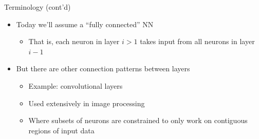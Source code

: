 \documentclass[aspectratio=169]{beamer}
\begin{document}
\begin{frame}{Terminology (cont'd)}

\begin{itemize}
	\item Today we'll assume a ``fully connected'' NN
	\begin{itemize}
                \item That is, each neuron in layer $i > 1$ takes input from all neurons in layer $i-1$
	\end{itemize}	
	\item But there are other connection patterns between layers
	\begin{itemize}
		\item Example: convolutional layers
		\item Used extensively in image processing
		\item Where subsets of neurons are constrained to only work on contiguous regions of input data
	\end{itemize}
\end{itemize}\end{frame}
\end{document}

